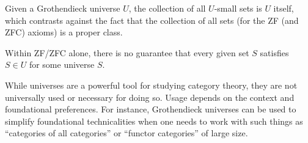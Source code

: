 
\begin{remark}
    Given a Grothendieck universe $U$, the collection of all $U$-small sets is $U$ itself, which contrasts against the fact that the collection of all sets (for the ZF (and ZFC) axioms) is a proper class.
\end{remark}

\begin{remark}
    Within ZF/ZFC alone, there is no guarantee that every given set $S$ satisfies $S \in U$ for some universe $S$.
\end{remark}

\begin{remark}
    While universes are a powerful tool for studying category theory, they are not universally used or necessary for doing so. Usage depends on the context and foundational preferences. For instance, Grothendieck universes can be used to simplify foundational technicalities when one needs to work with such things as ``categories of all categories'' or ``functor categories'' of large size. 
\end{remark}





